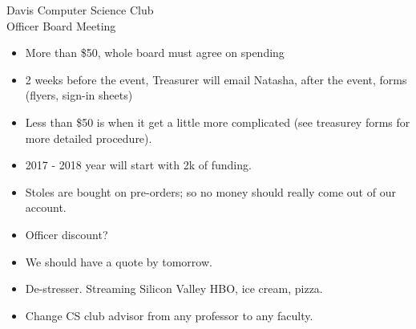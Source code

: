 \documentclass{article}
\begin{document}
\begin{Minutes}{Davis Computer Science Club\\Officer Board Meeting}

\missingExcused{%
}





\maketitle

\begin{itemize}
	\item More than \$50, whole board must agree on spending
	\item 2 weeks before the event, Treasurer will email Natasha, after the event, forms (flyers, sign-in sheets)
	\item Less than \$50 is when it get a little more complicated (see treasurey forms for more detailed procedure).
\end{itemize}

\begin{itemize}
	\item 2017 - 2018 year will start with 2k of funding. 
\end{itemize}

\begin{itemize}
	\item Stoles are bought on pre-orders; so no money should really come out of our account.
	\item Officer discount?
	\item We should have a quote by tomorrow.
\end{itemize}

\begin{itemize}
	\item De-stresser. Streaming Silicon Valley HBO, ice cream, pizza.
\end{itemize}

\begin{itemize}
	\item Change CS club advisor from any professor to any faculty.
\end{itemize}

\thispagestyle{creditfooter}

\end{Minutes}
\end{document}
